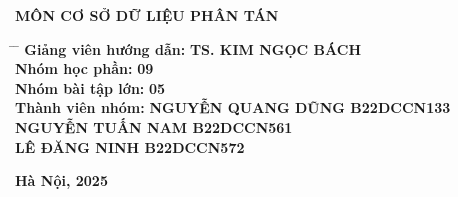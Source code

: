 \documentclass[14pt]{extarticle}
\begin{document}
\begin{titlepage}
\begin{center}
			\vspace{7pt}
			\textbf{MÔN CƠ SỞ DỮ LIỆU PHÂN TÁN}
		\end{center}
		

		
		\hspace{5cm}

		\begin{adjustwidth}{0.5cm}{0cm}
    \begin{tabbing}
        \fontsize{16pt}{20pt}\selectfont
        \hspace{6cm} \= \hspace{4cm} \= \kill
        \textbf{Giảng viên hướng dẫn:} \> \textbf{TS. KIM NGỌC BÁCH} \>\\ [6pt]
        \textbf{Nhóm học phần:} \> \textbf{09} \>\\ [6pt]
        \textbf{Nhóm bài tập lớn:} \> \textbf{05} \>\\ [6pt]
        \textbf{Thành viên nhóm:} \> \textbf{NGUYỄN QUANG DŨNG B22DCCN133} \>\\ [6pt]
                            \> \textbf{NGUYỄN TUẤN NAM B22DCCN561} \>\\ [6pt]
                            \> \textbf{LÊ ĐĂNG NINH B22DCCN572} \>\\ [6pt]
    \end{tabbing}
\end{adjustwidth}

		
		
		\vspace{14pt}
        \hspace{10cm}
		\begin{center}
			\textbf{Hà Nội, 2025}
		\end{center}
	\end{titlepage}
	

\clearpage

\tableofcontents

\clearpage


\renewcommand{\listfigurename}{Danh mục hình ảnh}
\listoffigures
{}



\renewcommand{\listtablename}{Danh mục bảng biểu}
\listoftables
{}
\newpage
\end{document}
